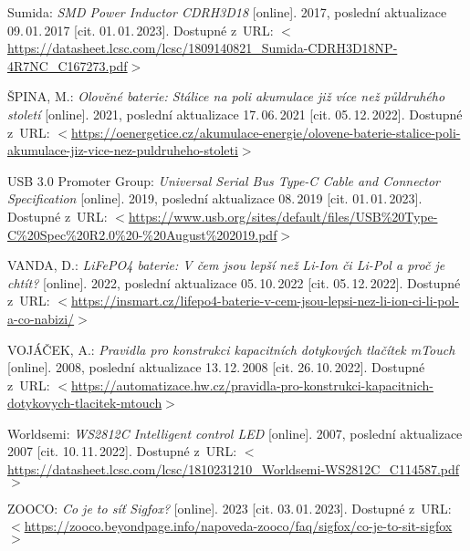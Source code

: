 \begin{thebibliography}{99}

    Sumida:
    \emph{SMD Power Inductor CDRH3D18}\/ [online].
    2017, poslední aktualizace 09.\,01.\,2017 [cit. 01.\,01.\,2023]. 
    Dostupné z~URL:
    \(<\)\url{https://datasheet.lcsc.com/lcsc/1809140821_Sumida-CDRH3D18NP-4R7NC_C167273.pdf}\(>\)

    ŠPINA, M.:
    \emph{Olověné baterie: Stálice na poli akumulace již více než půldruhého století}\/ [online].
    2021, poslední aktualizace 17.\,06.\,2021 [cit. 05.\,12.\,2022].
    Dostupné z~URL:
    \(<\)\url{https://oenergetice.cz/akumulace-energie/olovene-baterie-stalice-poli-akumulace-jiz-vice-nez-puldruheho-stoleti}\(>\)

    USB 3.0 Promoter Group:
    \emph{Universal Serial Bus Type-C Cable and Connector Specification}\/ [online].
    2019, poslední aktualizace 08.\,2019 [cit. 01.\,01.\,2023]. 
    Dostupné z~URL:
    \(<\)\url{https://www.usb.org/sites/default/files/USB%20Type-C%20Spec%20R2.0%20-%20August%202019.pdf}\(>\)

    VANDA, D.:
    \emph{LiFePO4 baterie: V čem jsou lepší než Li-Ion či Li-Pol a proč je chtít?}\/ [online].
    2022, poslední aktualizace 05.\,10.\,2022 [cit. 05.\,12.\,2022].
    Dostupné z~URL:
    \(<\)\url{https://insmart.cz/lifepo4-baterie-v-cem-jsou-lepsi-nez-li-ion-ci-li-pol-a-co-nabizi/}\(>\)

    VOJÁČEK, A.:
    \emph{Pravidla pro konstrukci kapacitních dotykových tlačítek mTouch}\/ [online].
    2008, poslední aktualizace 13.\,12.\,2008 [cit. 26.\,10.\,2022].
    Dostupné z~URL:
    \(<\)\url{https://automatizace.hw.cz/pravidla-pro-konstrukci-kapacitnich-dotykovych-tlacitek-mtouch}\(>\)

    Worldsemi:
    \emph{WS2812C Intelligent control LED}\/ [online].
    2007, poslední aktualizace 2007 [cit. 10.\,11.\,2022].
    Dostupné z~URL: 
    \(<\)\url{https://datasheet.lcsc.com/lcsc/1810231210_Worldsemi-WS2812C_C114587.pdf}\(>\)

    ZOOCO:
    \emph{Co je to síť Sigfox?}\/ [online].
    2023 [cit. 03.\,01.\,2023].
    Dostupné z~URL: 
    \(<\)\url{https://zooco.beyondpage.info/napoveda-zooco/faq/sigfox/co-je-to-sit-sigfox}\(>\)

\end{thebibliography}


